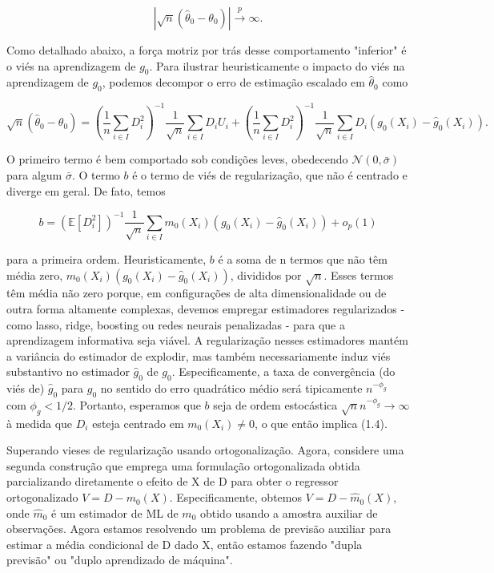 \documentclass[a4paper,12pt]{article}[abntex2]
\begin{document}
\begin{equation}
|\sqrt{n}(\hat{\theta}_0 - \theta_0)| \xrightarrow{p} \infty.
\end{equation}

Como detalhado abaixo, a força motriz por trás desse comportamento "inferior" é o viés na aprendizagem de $g_0$. Para ilustrar heuristicamente o impacto do viés na aprendizagem de $g_0$, podemos decompor o erro de estimação escalado em $\hat{\theta}_0$ como

\begin{equation}
\sqrt{n}(\hat{\theta}_0 - \theta_0) = \left(\frac{1}{n} \sum_{i \in I} D_i^2 \right)^{-1} \frac{1}{\sqrt{n}} \sum_{i \in I} D_i U_i + \left(\frac{1}{n} \sum_{i \in I} D_i^2 \right)^{-1} \frac{1}{\sqrt{n}} \sum_{i \in I} D_i (g_0(X_i) - \hat{g}_0(X_i)).
\end{equation}

O primeiro termo é bem comportado sob condições leves, obedecendo $\mathcal{N}(0, \bar{\sigma})$ para algum $\bar{\sigma}$. O termo $b$ é o termo de viés de regularização, que não é centrado e diverge em geral. De fato, temos

\begin{equation}
b = \left(\mathbb{E}[D_i^2]\right)^{-1} \frac{1}{\sqrt{n}} \sum_{i \in I} m_0(X_i) (g_0(X_i) - \hat{g}_0(X_i)) + o_p(1)
\end{equation}

para a primeira ordem. Heuristicamente, $b$ é a soma de n termos que não têm média zero, $m_0(X_i) (g_0(X_i) - \hat{g}_0(X_i))$, divididos por $\sqrt{n}$. Esses termos têm média não zero porque, em configurações de alta dimensionalidade ou de outra forma altamente complexas, devemos empregar estimadores regularizados - como lasso, ridge, boosting ou redes neurais penalizadas - para que a aprendizagem informativa seja viável. A regularização nesses estimadores mantém a variância do estimador de explodir, mas também necessariamente induz viés substantivo no estimador $\hat{g}_0$ de $g_0$. Especificamente, a taxa de convergência (do viés de) $\hat{g}_0$ para $g_0$ no sentido do erro quadrático médio será tipicamente $n^{-\phi_g}$ com $\phi_g < 1/2$. Portanto, esperamos que $b$ seja de ordem estocástica $\sqrt{n}n^{-\phi_g} \to \infty$ à medida que $D_i$ esteja centrado em $m_0(X_i) \neq 0$, o que então implica (1.4).

Superando vieses de regularização usando ortogonalização. Agora, considere uma segunda construção que emprega uma formulação ortogonalizada obtida parcializando diretamente o efeito de X de D para obter o regressor ortogonalizado $V = D - m_0(X)$. Especificamente, obtemos $V = D - \hat{m}_0(X)$, onde $\hat{m}_0$ é um estimador de ML de $m_0$ obtido usando a amostra auxiliar de observações. Agora estamos resolvendo um problema de previsão auxiliar para estimar a média condicional de D dado X, então estamos fazendo "dupla previsão" ou "duplo aprendizado de máquina".
\end{document}
